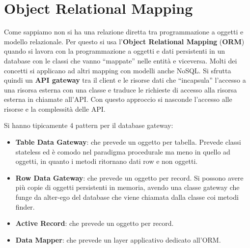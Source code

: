 \section{Object Relational Mapping}
Come sappiamo non si ha una relazione diretta tra programmazione a oggetti e modello relazionale. Per questo si usa l'\textbf{Object Relational Mapping} (\textbf{ORM}) quando si lavora con la programmazione a oggetti e dati persistenti in un database con le classi che vanno “mappate” nelle entità e viceversa. Molti dei concetti si applicano ad altri mapping con modelli anche NoSQL. Si sfrutta quindi un \textbf{API gateway} tra il client e le risorse dati che “incapsula” l'accesso a una risorsa esterna con una classe e traduce le richieste di accesso alla risorsa esterna in chiamate all'API. Con questo approccio si nasconde l'accesso alle risorse e la complessità delle API.

Si hanno tipicamente 4 pattern per il database gateway:
\begin{itemize}
    \item \textbf{Table Data Gateway}: che prevede un oggetto per tabella. Prevede classi stateless ed è comodo nel paradigma procedurale ma meno in quello ad oggetti, in quanto i metodi ritornano dati row e non oggetti.
    \item \textbf{Row Data Gateway}: che prevede un oggetto per record. Si possono avere più copie di oggetti persistenti in memoria, avendo una classe gateway che funge da alter-ego del database che viene chiamata dalla classe coi metodi finder.
    \item \textbf{Active Record}: che prevede un oggetto per record.
    \item \textbf{Data Mapper}: che prevede un layer applicativo dedicato all'ORM.
\end{itemize}
